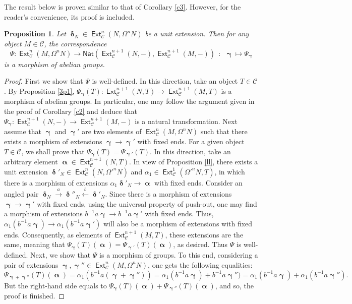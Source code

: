 \documentclass[11pt,a4paper]{amsart}
\newcommand{\rt}{\rightarrow}
\newcommand{\lrt}{\longrightarrow}
\newcommand{\lf}{\leftarrow}
\newcommand{\st}{\stackrel}
\newcommand{\C}{\mathscr{C} }
\def\Ext{\operatorname{{\mathsf{Ext}}}}
\def\syz{\mathsf{\Omega}}
\def\al{\operatorname{\boldsymbol{\alpha}}}
\def\ga{\operatorname{\boldsymbol{\gamma}}}
\def\de{\operatorname{\boldsymbol{\delta}}}
\newcommand{\nat}{{\mathsf{Nat}}}
\newtheorem{prop}[theorem]{Proposition}
\theoremstyle{definition}
\theoremstyle{plain}
\theoremstyle{definition}
\numberwithin{equation}{section}
\begin{document}
The result below is proven similar to that of Corollary \ref{c3}. However, for the reader's convenience, its proof is included.
\begin{prop}\label{p33}Let $\de_N\in\Ext^n_{\C}(N, \syz^nN)$ be a unit extension. Then for any object $M\in\C$, the correspondence
$$\Psi:\Ext^n_{\C}(M, \syz^nN)\lrt\nat(\Ext^{n+1}_{\C}(N, -), \Ext^{n+1}_{\C}(M, -)) ~~: ~~\ga\mapsto \Psi_{\ga}$$
is a morphism of abelian groups. 
\end{prop}
\begin{proof}First we show that $\Psi$ is well-defined. In this direction, take an object $T\in\C$. By  Proposition \ref{3p1}, $\Psi_{\ga}(T):\Ext^{n+1}_{\C}(N, T)\lrt\Ext^{n+1}_{\C}(M, T)$ is a morphism of abelian groups. In particular, one may follow the argument given in the proof of Corollary \ref{c2} and deduce that $\Psi_{\ga}:\Ext^{n+1}_{\C}(N, -)\lrt\Ext^{n+1}_{\C}(M, -)$ is a natural transformation. Next assume that $\ga$ and $\ga'$ are two elements of $\Ext^n_{\C}(M, \syz^nN)$ such that there exists a morphism of extensions $\ga\lrt\ga'$ with fixed ends. For a given object $T\in\C$, we shall prove that $\Psi_{\ga}(T)=\Psi_{\ga'}(T)$. In this direction, take an arbitrary element $\al\in\Ext^{n+1}_{\C}(N, T)$. In view of Proposition \ref{ll}, there exists a unit extension $\de'_N\in\Ext^n_{\C}(N, {\syz'}^nN)$ and $\alpha_1\in\Ext^1_{\C}({\syz'}^nN, T)$, in which there is a morphism of extensions $\alpha_1\de'_N\lrt\al$ with fixed ends. Consider an angled pair $\de_N\st{a}\rt\de''_N\st{b}\lf\de'_N$. Since there is a morphism of extensions $\ga\lrt\ga'$ with fixed ends, using the universal property of push-out, one may find a morphism of extensions $b^{-1}a\ga\lrt b^{-1}a\ga'$ with fixed ends. Thus, $\alpha_1(b^{-1}a\ga)\lrt\alpha_1( b^{-1}a\ga')$ will also be a morphism of extensions with fixed ends. Consequently, as elements of $\Ext^{n+1}_{\C}(M, T)$, these extensions are the same, meaning that  $\Psi_{\ga}(T)(\al)=\Psi_{\ga'}(T)(\al)$, as desired. Thus $\Psi$ is well-defined. Next, we show that $\Psi$ is a morphism of groups. To this end, considering a pair of extensions $\ga, \ga''\in\Ext^n_{\C}(M, \syz^nN)$, one gets the following equalities: $$\Psi_{\ga+\ga''}(T)(\al)=\alpha_1(b^{-1}a(\ga+\ga''))=\alpha_1(b^{-1}a\ga)+b^{-1}a\ga'')=\alpha_1(b^{-1}a\ga)+\alpha_1(b^{-1}a\ga'').$$ But the right-hand side equals to $\Psi_{\ga}(T)(\al)+\Psi_{\ga''}(T)(\al)$, and so,  the proof is finished.
\end{proof}
\end{document}
